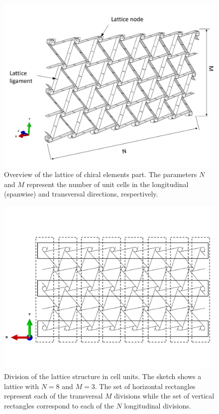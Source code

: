     \begin{figure}[!htpb]
      \centering
      \includegraphics[width=0.8 \textwidth]{figures/model/lattice}
      \caption[Overview of the lattice of chiral elements part]{Overview of the lattice of chiral elements part. The parameters $N$ and $M$ represent the number of unit cells in the longitudinal (spanwise) and transversal directions, respectively.}\label{fig:lattice}
    \end{figure}

    \begin{figure}[!htpb]
      \centering
      \includegraphics[width=0.8 \textwidth]{figures/model/lattice-NandM}
      \caption[Division of the lattice structure in cell units]{Division of the lattice structure in cell units. The sketch shows a lattice with $N = 8$ and $M = 3$. The set of horizontal rectangles represent each of the transversal $M$ divisions while the set of vertical rectangles correspond to each of the $N$ longitudinal divisions.}\label{fig:lattice-NandM}
    \end{figure}

